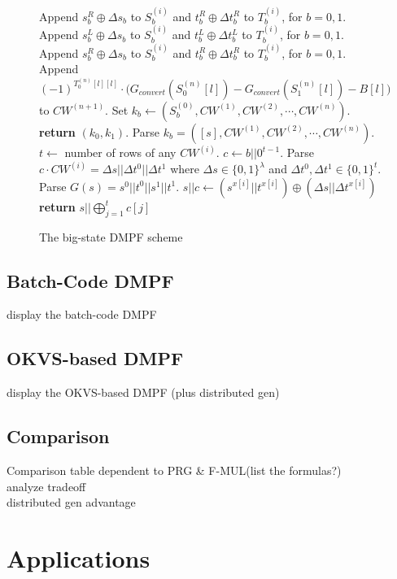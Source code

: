 \documentclass[sigconf]{acmart}
\begin{document}
\begin{figure}
{{\begin{algorithmic}
  \State Append $s_b^R\oplus \Delta s_b$ to $S_b^{(i)}$ and $t_b^R\oplus \Delta t_b^R$ to $T_b^{(i)}$, for $b = 0,1$.
  \Else
  \State Append $s_b^L\oplus \Delta s_b$ to $S_b^{(i)}$ and $t_b^L\oplus \Delta t_b^L$ to $T_b^{(i)}$, for $b = 0,1$.
  \State Append $s_b^R\oplus \Delta s_b$ to $S_b^{(i)}$ and $t_b^R\oplus \Delta t_b^R$ to $T_b^{(i)}$, for $b = 0,1$.
  \EndIf
  \EndFor
  \EndFor
  \State Append $(-1)^{T_0^{(n)}[l][l]}\cdot\big(G_{convert}(S_0^{(n)}[l])-G_{convert}(S_1^{(n)}[l])-B[l]\big)$ to $CW^{(n+1)}$. 
  \EndFor
  \State Set $k_b \gets (S_b^{(0)}, CW^{(1)},CW^{(2)},\cdots,CW^{(n)})$.
  \State \textbf{return} $(k_0,k_1)$.
  \EndProcedure
  \State Parse $k_b = ([s],CW^{(1)},CW^{(2)},\cdots,CW^{(n)})$. 
  \State $t\leftarrow$ number of rows of any $CW^{(i)}$.
  \State $c\gets b||0^{t-1}$.
  \State Parse $c\cdot CW^{(i)} = \Delta s||\Delta t^0||\Delta t^1$ where $\Delta s\in\{0,1\}^\lambda$ and $\Delta t^0,\Delta t^1\in \{0,1\}^t$. 
  \State Parse $G(s) = s^0||t^0||s^1||t^1$. 
  \State $s||c\gets (s^{x[i]}||t^{x[i]})\oplus (\Delta s||\Delta t^{x[i]})$
  \EndFor
  \State \textbf{return} $s||\bigoplus_{j = 1}^t c[j]$
  \EndProcedure
  \end{algorithmic}
  }}
  \caption{The big-state DMPF scheme}
\end{figure}
\fi

\subsection{Batch-Code DMPF}
display the batch-code DMPF 

\subsection{OKVS-based DMPF}
display the OKVS-based DMPF (plus distributed gen)

\subsection{Comparison}
Comparison table dependent to PRG \& F-MUL(list the formulas?)\\
analyze tradeoff\\
distributed gen advantage

\section{Applications}
\end{document}
